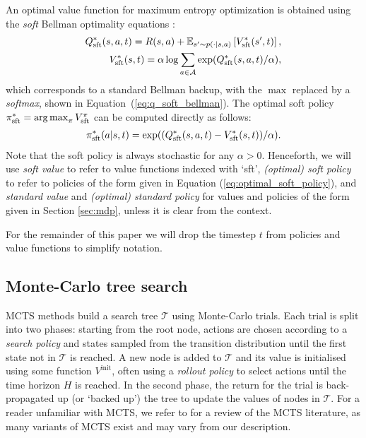\documentclass{article}
\newcommand{\bb}[1]{\mathbb{#1}}
\newcommand{\cl}[1]{\mathcal{#1}}
\newcommand{\Vss}[1]{V^*_{\textnormal{sft}}(#1)}
\newcommand{\Qss}[2]{Q^*_{\textnormal{sft}}(#1,#2)}
\newcommand{\pis}{\pi^*_{\textnormal{sft}}}
\DeclareMathOperator*{\argmax}{arg\,max}
\theoremstyle{plain}
\begin{document}
        An optimal value function for maximum entropy optimization is obtained using the \textit{soft} Bellman optimality equations \cite{haarnoja2018soft}:
        \begin{align}
            \Qss{s}{a,t} = R(s,a) 
            + \bb{E}_{s' \sim p(\cdot | s,a)} 
            \left[ \Vss{s',t} \right], \label{eq:v_soft_bellman} \\
            \Vss{s,t} = 
            \alpha \log \sum_{a\in\cl{A}} \exp(\Qss{s}{a,t}/\alpha), \label{eq:q_soft_bellman}
        \end{align}
        which corresponds to a standard Bellman backup, with the $\max$ replaced by a \textit{softmax}, shown in Equation~(\ref{eq:q_soft_bellman}). The optimal soft policy $\pis=\argmax_\pi V_{\text{sft}}^\pi$ can be computed directly \cite{nachum2017bridging} as follows:
        \begin{align}
            \pis(a|s,t) = \exp((\Qss{s}{a,t}-\Vss{s,t})/\alpha). \label{eq:optimal_soft_policy}
        \end{align}
         Note that the soft policy is always stochastic for any $\alpha > 0$. Henceforth, we will use \textit{soft value} to refer to value functions indexed with `sft', \textit{(optimal) soft policy} to refer to policies of the form given in Equation (\ref{eq:optimal_soft_policy}), and \textit{standard value} and \textit{(optimal) standard policy} for values and policies of the form given in Section \ref{sec:mdp}, unless it is clear from the context.
         
         For the remainder of this paper we will drop the timestep $t$ from policies and value functions to simplify notation.
    
    
    \subsection{Monte-Carlo tree search} \label{sec:mcts}
    		MCTS methods build a search tree $\cl{T}$ using Monte-Carlo trials. Each trial is split into two phases: starting from the root node, actions are chosen according to a \textit{search policy} and states sampled from the transition distribution until the first state not in $\cl{T}$ is reached. A new node is added to $\cl{T}$ and its value is initialised using some function $V^{\text{init}}$, often using a \textit{rollout policy} to select actions until the time horizon $H$ is reached. In the second phase, the return for the trial is back-propagated up (or `backed up') the tree to update the values of nodes in $\cl{T}$. For a reader unfamiliar with MCTS, we refer to \cite{browne2012survey} for a review of the MCTS literature, as many variants of MCTS exist and may vary from our description. 
        
\end{document}
